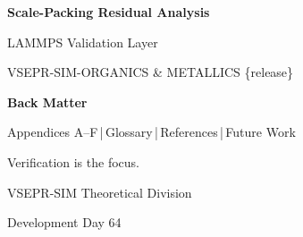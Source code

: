 \documentclass[11pt, a4paper, oneside]{article}
\begin{document}
\begin{titlepage}
  \centering
  \vspace*{1.5cm}
  {\Huge\bfseries Scale-Packing Residual Analysis\par}
  \vspace{0.5cm}
  {\LARGE LAMMPS Validation Layer\par}
  \vspace{0.3cm}
  {\large VSEPR-SIM-ORGANICS \& METALLICS \{release\}\par}
  \vspace{1.5cm}
  {\LARGE\bfseries Back Matter\par}
  \vspace{0.5cm}
  {\large Appendices A--F\,|\,Glossary\,|\,References\,|\,Future Work\par}
  \vspace{2cm}
  {\normalsize Verification is the focus.\par}
  \vspace{1cm}
  {\large VSEPR-SIM Theoretical Division\par}
  {\large Development Day 64\par}
\end{titlepage}

\tableofcontents
\newpage
\end{document}
